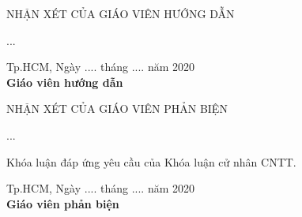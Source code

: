 \newcommand{\Pointilles}[1]{%
	\par\nobreak
	\noindent\rule{0pt}{1.5\baselineskip}
	\multido{}{#1}{\noindent\makebox[\linewidth]{\dotfill}\endgraf} ...
	\bigskip%
}
	
\begin{titlepage}
	\begin{center}
		\begin{large}
			NHẬN XÉT CỦA GIÁO VIÊN HƯỚNG DẪN
		\end{large}
	\end{center}
\Pointilles{17}
\begin{center}
	\raggedleft\textnormal{Tp.HCM, Ngày .... tháng .... năm 2020} \hfill \\
	\raggedleft\textbf{Giáo viên hướng dẫn}\hspace{1.5cm} \hfill
\end{center}
\end{titlepage}

\begin{titlepage}
	\begin{center}
		\begin{large}
			NHẬN XÉT CỦA GIÁO VIÊN PHẢN BIỆN
		\end{large}
	\end{center}
	\Pointilles{16}
	
Khóa luận đáp ứng yêu cầu của Khóa luận cử nhân CNTT.

	\begin{center}
		\raggedleft\textnormal{Tp.HCM, Ngày .... tháng .... năm 2020} \hfill \\
		\raggedleft\textbf{Giáo viên phản biện}\hspace{1.5cm} \hfill
	\end{center}
\end{titlepage}
	
